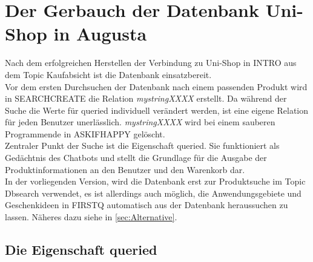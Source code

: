 \section{Der Gerbauch der Datenbank Uni-Shop in Augusta}
\label{sec:SQL}
Nach dem erfolgreichen Herstellen der Verbindung zu Uni-Shop in INTRO aus dem Topic Kaufabsicht ist die Datenbank einsatzbereit.\\
Vor dem ersten Durchsuchen der Datenbank nach einem passenden Produkt wird in SEARCHCREATE die Relation \textit{mystringXXXX} erstellt. Da während der Suche die Werte für queried individuell verändert werden, ist eine eigene Relation für jeden Benutzer unerlässlich. \textit{mystringXXXX} wird bei einem sauberen Programmende in ASKIFHAPPY gelöscht.\\
Zentraler Punkt  der Suche ist die Eigenschaft queried. Sie funktioniert als Gedächtnis des Chatbots und stellt die Grundlage für die Ausgabe der Produktinformationen an den Benutzer und den Warenkorb dar.\\
In der vorliegenden Version, wird die Datenbank erst zur Produktsuche im Topic Dbsearch verwendet, es ist allerdings auch möglich, die Anwendungsgebiete und Geschenkideen in FIRSTQ automatisch aus der Datenbank heraussuchen zu lassen. Näheres dazu siehe in \ref{sec:Alternative}.


\subsection{Die Eigenschaft queried}
\label{sec:queried}

